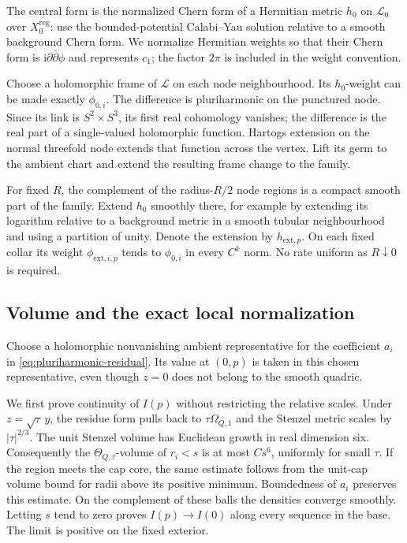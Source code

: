 The central form is the normalized Chern form of a Hermitian
metric $h_0$ on $\mathcal L_0$ over $X_0^{\mathrm{reg}}$:
use the bounded-potential Calabi--Yau solution relative to a
smooth background Chern form. We normalize Hermitian weights
so that their Chern form is $\mathrm i\partial\bar\partial\phi$
and represents $c_1$; the factor $2\pi$ is included in the
weight convention.

Choose a holomorphic frame of $\mathcal L$ on each node
neighbourhood. Its $h_0$-weight can be made exactly
$\phi_{0,i}$. The difference is pluriharmonic on the punctured
node. Since its link is $S^2\times S^3$, its first real
cohomology vanishes; the difference is the real part of a
single-valued holomorphic function. Hartogs extension on the
normal threefold node extends that function across the vertex.
Lift its germ to the ambient chart and extend the resulting
frame change to the family.

For fixed $R$, the complement of the radius-$R/2$ node
regions is a compact smooth part of the family. Extend $h_0$
smoothly there, for example by extending its logarithm relative
to a background metric in a smooth tubular neighbourhood and
using a partition of unity. Denote the extension by
$h_{\mathrm{ext},p}$. On each fixed collar its weight
$\phi_{\mathrm{ext},i,p}$ tends to $\phi_{0,i}$ in every
$C^k$ norm. No rate uniform as $R\downarrow0$ is required.

\subsection{Volume and the exact local normalization}

Choose a holomorphic nonvanishing ambient representative for
the coefficient $a_i$ in \eqref{eq:pluriharmonic-residual}.
Its value at $(0,p)$ is taken in this chosen representative,
even though $z=0$ does not belong to the smooth quadric.

We first prove continuity of $I(p)$ without restricting the
relative scales. Under $z=\sqrt{\tau}\,y$, the residue form
pulls back to $\tau\Omega_{Q,1}$ and the Stenzel metric scales
by $|\tau|^{2/3}$. The unit Stenzel volume has Euclidean
growth in real dimension six. Consequently the
$\Theta_{Q,\tau}$-volume of $r_i<s$ is at most $Cs^6$,
uniformly for small $\tau$. If the region meets the cap
core, the same estimate follows from the unit-cap volume
bound for radii above its positive minimum. Boundedness
of $a_i$ preserves this estimate. On the complement of
these balls the densities converge smoothly. Letting $s$
tend to zero proves $I(p)\to I(0)$ along every sequence in
the base. The limit is positive on the fixed exterior.

